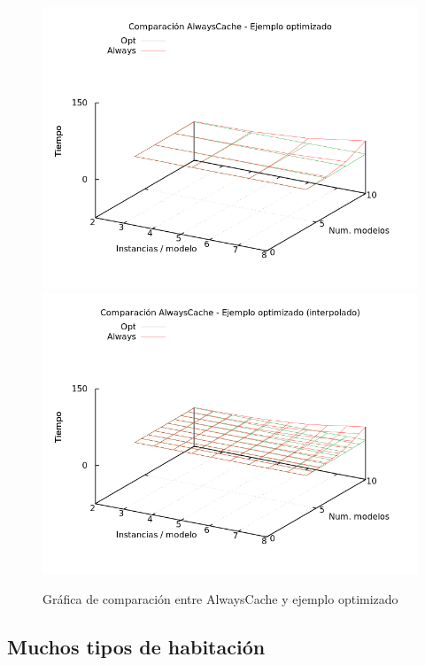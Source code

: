 \begin{figure}[H]
\centering
\includegraphics[scale=0.5]{img/comp-alw-opt}
\includegraphics[scale=0.5]{img/comp-alw-opt-spl}
\caption{Gráfica de comparación entre AlwaysCache y ejemplo optimizado
\label{fig:grfcompall}}
\end{figure}








\subsection{Muchos tipos de habitación}


